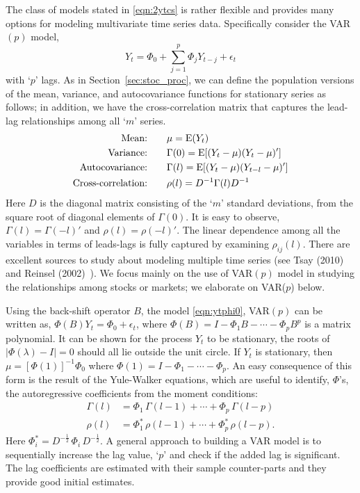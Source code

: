The class of models stated in \eqref{eqn:2ytcs} is rather flexible and provides many options for modeling multivariate time series data. Specifically consider the VAR$(p)$ model,
	\begin{equation} \label{eqn:ytphi0}
	Y_{t} = \Phi_0 + \sum_{j=1}^{p} \Phi_jY_{t-j} + \epsilon_t 
	\end{equation}
with `$p$' lags. As in Section~\ref{sec:stoc_proc}, we can define the population versions of the mean, variance, and autocovariance functions for stationary series as follows; in addition, we have the cross-correlation matrix that captures the lead-lag relationships among all `$m$' series.
	\begin{equation} \label{eq:meanvarianceauto}
        \begin{split}
	\text{Mean:\qquad} & \mu= \Ex(Y_t) \\
	\text{Variance:\qquad} & \Gamma(0)= \Ex[(Y_t - \mu)(Y_t - \mu)'] \\
	\text{Autocovariance:\qquad} & \Gamma(l)= \Ex[(Y_t - \mu)(Y_{t-l} - \mu)'] \\
	\text{Cross-correlation:\qquad} & \rho(l) = D^{-1}\Gamma(l) D^{-1}
        \end{split}
        \end{equation}
Here $D$ is the diagonal matrix consisting of the `$m$' standard deviations, from the square root of diagonal elements of $\Gamma(0)$. It is easy to observe,  $\Gamma(l)= \Gamma(-l)'$ and $\rho(l)= \rho(-l)'$. The linear dependence among all the variables in terms of leads-lags is fully captured by examining $\rho_{ij}(l)$. There are excellent sources to study about modeling multiple time series (see Tsay (2010)~\cite{tsay} and Reinsel (2002)~\cite{2002reinsel}). We focus mainly on the use of  VAR$(p)$ model in studying the relationships among stocks or markets; we elaborate on VAR($p$) below.


Using the back-shift operator $B$, the model \eqref{eqn:ytphi0}, VAR$(p)$ can be written as, $ \Phi(B)Y_t= \Phi_0 + \epsilon_t$, where $\Phi(B)= I - \Phi_1 B - \cdots - \Phi_p B^p$ is a matrix polynomial. It can be shown for the process $Y_t$ to be stationary, the roots of $\lvert \Phi(\lambda)-I \rvert= 0$ should all lie outside the unit circle. If $Y_t$ is stationary, then $\mu= [\Phi(1)]^{-1} \Phi_0$ where $\Phi(1)= I - \Phi_1 - \cdots - \Phi_p$. An easy consequence of this form is the result of the Yule-Walker equations, which are useful to identify, $\Phi$'s, the autoregressive coefficients from the moment conditions:
	\begin{equation} \label{eqn:2gammarho}
	\begin{split}
	\Gamma(l)&= \Phi_1 \,\Gamma(l-1) +\cdots + \Phi_p\, \Gamma(l-p) \\
	\rho(l)&= \Phi_1^* \,\rho(l-1) + \cdots + \Phi_p^* \, \rho(l-p).
	\end{split}
	\end{equation}
Here $\Phi_i^*= D^{-\frac{1}{2}} \,\Phi_i\, D^{-\frac{1}{2}}$. A general approach to building a VAR model is to sequentially increase the lag value, `$p$' and check if the added lag is significant. The lag coefficients are estimated with their sample counter-parts and they provide good initial estimates. 


